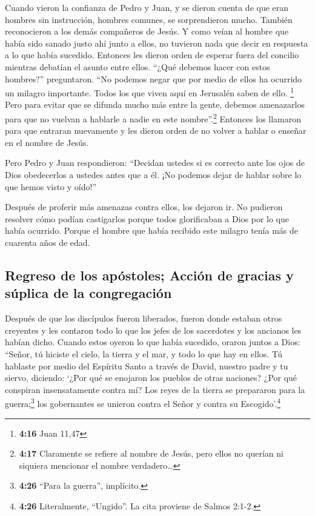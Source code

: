  Cuando vieron la confianza de Pedro y Juan, y se dieron
cuenta de que eran hombres sin instrucción, hombres comunes, se
sorprendieron mucho. También reconocieron a los demás compañeros de
Jesús.  Y como veían al hombre que había sido sanado
justo ahí junto a ellos, no tuvieron nada que decir en respuesta a lo
que había sucedido.  Entonces les dieron orden de esperar
fuera del concilio mientras debatían el asunto entre ellos.
 ``¿Qué debemos hacer con estos hombres?'' preguntaron.
``No podemos negar que por medio de ellos ha ocurrido un milagro
importante. Todos los que viven aquí en Jerusalén saben de ello.
\footnote{\textbf{4:16} Juan 11,47}  Pero para evitar que
se difunda mucho más entre la gente, debemos amenazarlos para que no
vuelvan a hablarle a nadie en este nombre''.\footnote{\textbf{4:17}
  Claramente se refiere al nombre de Jesús, pero ellos no querían ni
  siquiera mencionar el nombre verdadero\ldots{}} 
Entonces los llamaron para que entraran nuevamente y les dieron orden de
no volver a hablar o enseñar en el nombre de Jesús.

 Pero Pedro y Juan respondieron: ``Decidan ustedes si es
correcto ante los ojos de Dios obedecerlos a ustedes antes que a él.
 ¡No podemos dejar de hablar sobre lo que hemos visto y
oído!''

 Después de proferir más amenazas contra ellos, los
dejaron ir. No pudieron resolver cómo podían castigarlos porque todos
glorificaban a Dios por lo que había ocurrido.  Porque el
hombre que había recibido este milagro tenía más de cuarenta años de
edad.

\hypertarget{regreso-de-los-apuxf3stoles-acciuxf3n-de-gracias-y-suxfaplica-de-la-congregaciuxf3n}{%
\subsection{Regreso de los apóstoles; Acción de gracias y súplica de la
congregación}\label{regreso-de-los-apuxf3stoles-acciuxf3n-de-gracias-y-suxfaplica-de-la-congregaciuxf3n}}

 Después de que los discípulos fueron liberados, fueron
donde estaban otros creyentes y les contaron todo lo que los jefes de
los sacerdotes y los ancianos les habían dicho.  Cuando
estos oyeron lo que había sucedido, oraron juntos a Dios: ``Señor, tú
hiciste el cielo, la tierra y el mar, y todo lo que hay en ellos.
 Tú hablaste por medio del Espíritu Santo a través de
David, nuestro padre y tu siervo, diciendo: `¿Por qué se enojaron los
pueblos de otras naciones? ¿Por qué conspiran insensatamente contra mí?
 Los reyes de la tierra se prepararon para la
guerra;\footnote{\textbf{4:26} ``Para la guerra'', implícito.} los
gobernantes se unieron contra el Señor y contra su Escogido'.\footnote{\textbf{4:26}
  Literalmente, ``Ungido''. La cita proviene de Salmos 2:1-2.}

